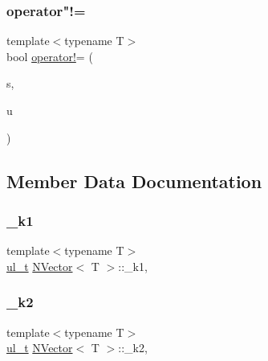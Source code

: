 \mbox{\label{class_n_vector_ad51fab9cb11a2faf828455d676ee6755}} 
\subsubsection{\texorpdfstring{operator"!=}{operator!=}\hspace{0.1cm}{\footnotesize\ttfamily [3/3]}}
{\footnotesize\ttfamily template$<$typename T$>$ \\
bool \mbox{\hyperlink{class_n_vector_a697b7e9e059d8045dc5f682f94521548}{operator!}}= (\begin{DoxyParamCaption}\item[{T}]{s,  }\item[{const \mbox{\hyperlink{class_n_vector}{N\+Vector}}$<$ T $>$ \&}]{u }\end{DoxyParamCaption})\hspace{0.3cm}{\ttfamily [friend]}}



\subsection{Member Data Documentation}
\mbox{\label{class_n_vector_a355ee9ef9436669e52d0ff4538f85e27}} 
\subsubsection{\texorpdfstring{\_k1}{\_k1}}
{\footnotesize\ttfamily template$<$typename T$>$ \\
\mbox{\hyperlink{typedef_8h_a1b140a2034db3f5dfe18a987745df43a}{ul\+\_\+t}} \mbox{\hyperlink{class_n_vector}{N\+Vector}}$<$ T $>$\+::\+\_\+k1\hspace{0.3cm}{\ttfamily [mutable]}, {\ttfamily [protected]}}

\mbox{\label{class_n_vector_a6591512e0566996c42f3d74c8174385e}} 
\subsubsection{\texorpdfstring{\_k2}{\_k2}}
{\footnotesize\ttfamily template$<$typename T$>$ \\
\mbox{\hyperlink{typedef_8h_a1b140a2034db3f5dfe18a987745df43a}{ul\+\_\+t}} \mbox{\hyperlink{class_n_vector}{N\+Vector}}$<$ T $>$\+::\+\_\+k2\hspace{0.3cm}{\ttfamily [mutable]}, {\ttfamily [protected]}}



